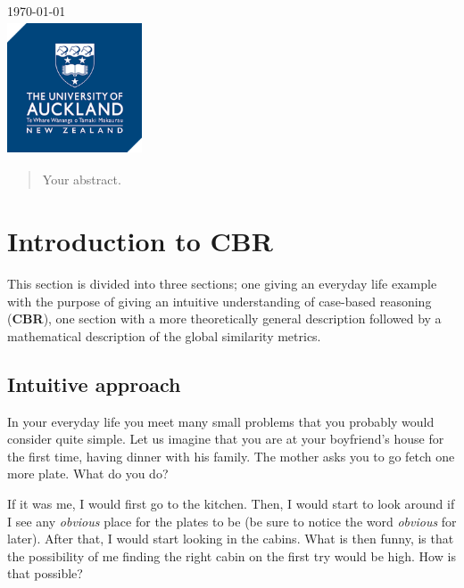 \documentclass[12pt]{article}
\begin{document}
\begin{titlepage}

{\large \today}\\[2cm] 
\includegraphics[width=4cm,height=4cm]{uoa-logo.png}\\[1cm] 
 

\vfill %

\end{titlepage}


\begin{abstract}
Your abstract.
\end{abstract}

\section{Introduction to CBR}

This section is divided into three sections; one giving an everyday life example with the purpose of giving an intuitive understanding of case-based reasoning (\textbf{CBR}), one section with a more theoretically general description followed by a mathematical description of the global similarity metrics. 

\subsection{Intuitive approach}

In your everyday life you meet many small problems that you probably would consider quite simple. Let us imagine that you are at your boyfriend's house for the first time, having dinner with his family. The mother asks you to go fetch one more plate. What do you do?

If it was me, I would first go to the kitchen. Then, I would start to look around if I see any \textit{obvious} place for the plates to be (be sure to notice the word \textit{obvious} for later). After that, I would start looking in the cabins. What is then funny, is that the possibility of me finding the right cabin on the first try would be high. How is that possible? 
\end{document}
